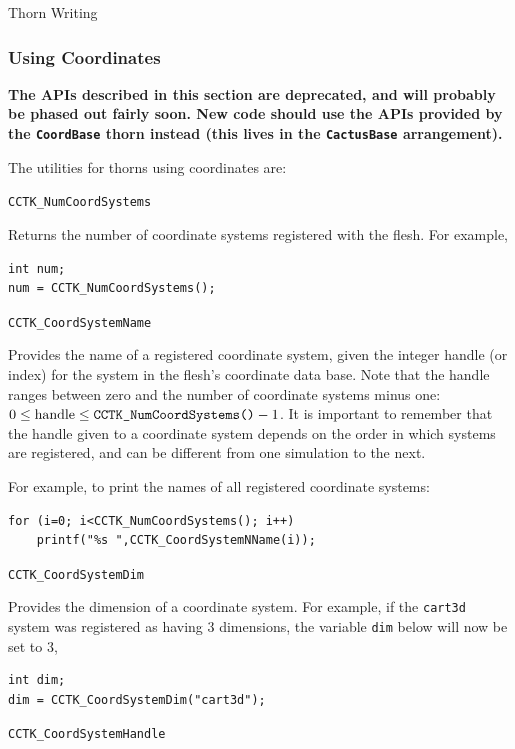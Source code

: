 \begin{cactuspart}{Thorn Writing}
\subsubsection{Using Coordinates}

\textbf{The APIs described in this section are deprecated, and will
probably be phased out fairly soon.
New code should use the APIs provided by the \texttt{CoordBase} thorn
instead (this lives in the \texttt{CactusBase} arrangement).}

The utilities for thorns using coordinates are:

\begin{Lentry}

\item[\texttt{CCTK\_NumCoordSystems}]

Returns the number of coordinate systems registered with the flesh. For example,
%
\begin{verbatim}
int num;
num = CCTK_NumCoordSystems();
\end{verbatim}

\item[\texttt{CCTK\_CoordSystemName}]

Provides the name of a registered coordinate system, given the integer
handle (or index) for the system in the flesh's coordinate data base.
Note that the handle ranges between zero and the number of coordinate systems minus one: $0 \le \mbox{handle} \le \mbox{\texttt{CCTK\_NumCoordSystems()}}-1$.
It is important to remember that the handle given to a coordinate system
depends on the order in which systems are registered, and can be different
from one simulation to the next.

For example, to print the names of all registered coordinate systems:
%
\begin{verbatim}
for (i=0; i<CCTK_NumCoordSystems(); i++)
    printf("%s ",CCTK_CoordSystemNName(i));
\end{verbatim}

\item[\texttt{CCTK\_CoordSystemDim}]

Provides the dimension of a coordinate system. For example, if
the \texttt{cart3d} system was registered as having 3 dimensions, the
variable \texttt{dim} below will now be set to 3,
%
\begin{verbatim}
int dim;
dim = CCTK_CoordSystemDim("cart3d");
\end{verbatim}

\item[\texttt{CCTK\_CoordSystemHandle}]


\end{Lentry}
\end{cactuspart}
